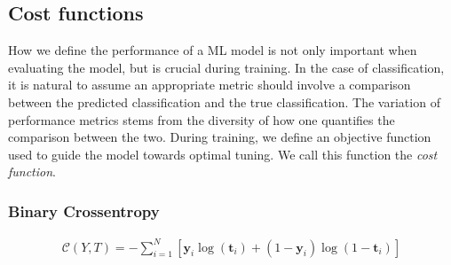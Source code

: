 \subsection{Cost functions}\label{subsec:Cost}
How we define the performance of a \ac{ML} model is not only important when 
evaluating the model, but is crucial during training. In the case of classification,
it is natural to assume an appropriate metric should involve a comparison between 
the predicted classification and the true classification. The variation of 
performance metrics stems from the diversity of how one quantifies the comparison 
between the two. During training, we define an objective function used to guide 
the model towards optimal tuning. We call this function the \emph{cost function}. 
\\
\subsubsection{Binary Crossentropy}
\begin{align}
    \mathcal{C}\left(Y, T\right) =-\sum_{i=1}^N\left[ \textbf{y}_i \log \left(\textbf{t}_i\right)+\left(1-\textbf{y}_i\right) \log \left(1-\textbf{t}_i\right)\right]
\end{align}
